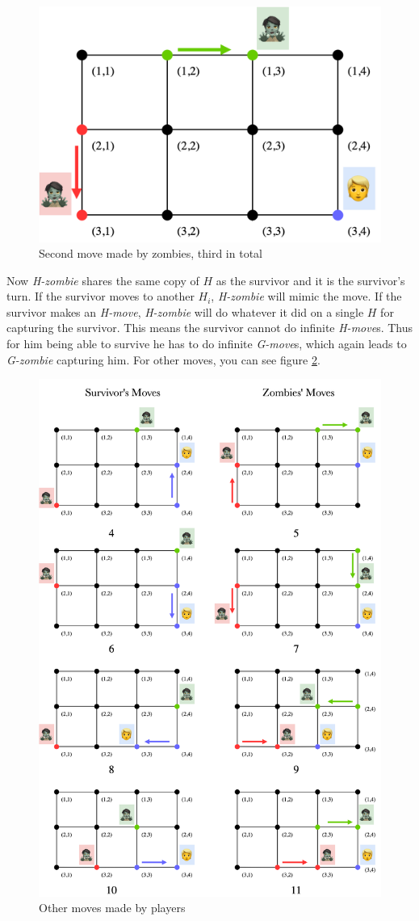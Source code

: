\documentclass[1p]{elsarticle}
\begin{document}
\begin{figure}[h!]
	\centering
	\includegraphics[width=0.5\linewidth]{fig/p34m3.png}
	\caption{Second move made by zombies, third in total}
	\label{fig:p5}
\end{figure}

Now {\it H-zombie} shares the same copy of $H$ as the survivor and it is the survivor's turn. If the survivor moves to
another $H_i$, {\it H-zombie} will mimic the move. If the survivor makes an {\it H-move}, {\it H-zombie} will do
whatever it did on a single $H$ for capturing the survivor. This means the survivor cannot do infinite {\it H-move}s.
Thus for him being able to survive he has to do infinite {\it G-move}s, which again leads to {\it G-zombie} capturing
him. For other moves, you can see figure \ref{fig:p6}.

\begin{figure}[h!]
	\centering
	\includegraphics[width=1\linewidth]{fig/p34m6.png}
	\caption{Other moves made by players}
	\label{fig:p6}
\end{figure}

	
\end{document}
